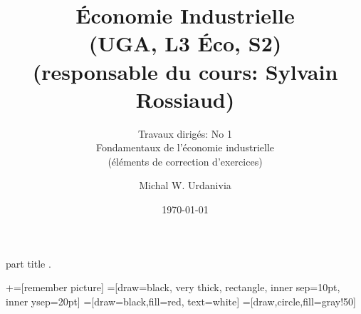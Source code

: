 
\usepackage{color}
\usepackage{tikz}

\usepackage{enumerate}   


%
  \usepackage{eso-pic}

{
    \begin{centering}
    \begin{beamercolorbox}[sep=11pt,center]{part title}
    \thesection.~\insertsection\par
    \end{beamercolorbox}
    \end{centering}
}

\title[]{ \textbf{Économie Industrielle} \\ (UGA, L3 Éco, S2) \\ (responsable du cours: Sylvain Rossiaud)}
\subtitle{Travaux dirigés: No 1\\ 
Fondamentaux de l'économie industrielle\\(éléments de correction d'exercices)}
\date{\today}
\author{Michal W. Urdanivia\inst{*}}




\usetikzlibrary{positioning}
\usetikzlibrary{snakes}
\usetikzlibrary{calc}
\usetikzlibrary{arrows}
\usetikzlibrary{decorations.markings}
\usetikzlibrary{shapes.misc}
\usetikzlibrary{matrix,shapes,arrows,fit,tikzmark}
\usetikzlibrary{shapes}
\newcommand\marktopleft[1]{
    \tikz[overlay,remember picture] 
        \node (marker-#1-a) at (-.3em,.3em) {};%
}
\newcommand\markbottomright[2]{%
    \tikz[overlay,remember picture] 
        \node (marker-#1-b) at (0em,0em) {};%
}
+=[remember picture] 
 =[draw=black, very thick, rectangle, inner sep=10pt, inner ysep=20pt]
 =[draw=black,fill=red, text=white]
=[draw,circle,fill=gray!50]



